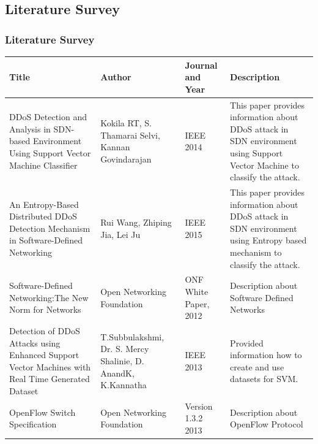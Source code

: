 \documentclass[10pt]{beamer}
\begin{document}



\begin{frame}
\section[]{Literature Survey}
\frametitle{Literature Survey}
\scriptsize
\begin{center}
\begin{tabular}{ | m{2cm} | m{2cm}| m{2cm} | m{3cm} | } 
\hline
\textbf{Title} & \textbf{Author} & \textbf{Journal and Year} & \textbf{Description} \\
\hline
DDoS Detection and Analysis in SDN-based Environment Using Support Vector Machine Classifier & 
Kokila RT, S. Thamarai Selvi, Kannan Govindarajan & 
IEEE 2014 & 
This paper provides information about DDoS attack in SDN environment using Support Vector Machine to classify the attack.\\ 
\hline
An Entropy-Based Distributed DDoS Detection Mechanism in Software-Defined Networking &
Rui Wang, Zhiping Jia, Lei Ju & 
IEEE 2015 & 
This paper provides information about DDoS attack in SDN environment using Entropy based mechanism to classify the attack.\\ 
\hline
Software-Defined Networking:The New Norm for Networks & 
Open Networking Foundation & 
ONF White Paper, 2012 & 
Description about Software Defined Networks\\
\hline
Detection of DDoS Attacks using Enhanced Support Vector Machines with Real Time Generated Dataset & 
T.Subbulakshmi, Dr. S. Mercy Shalinie, D. AnandK,  K.Kannatha&
IEEE 2013 &
Provided information how to create and use datasets for SVM.\\
\hline
OpenFlow Switch Specification& 
Open Networking Foundation &
Version 1.3.2 2013 &
Description about OpenFlow Protocol\\
\hline
\end{tabular}
\end{center}
\end{frame}
\end{document}
